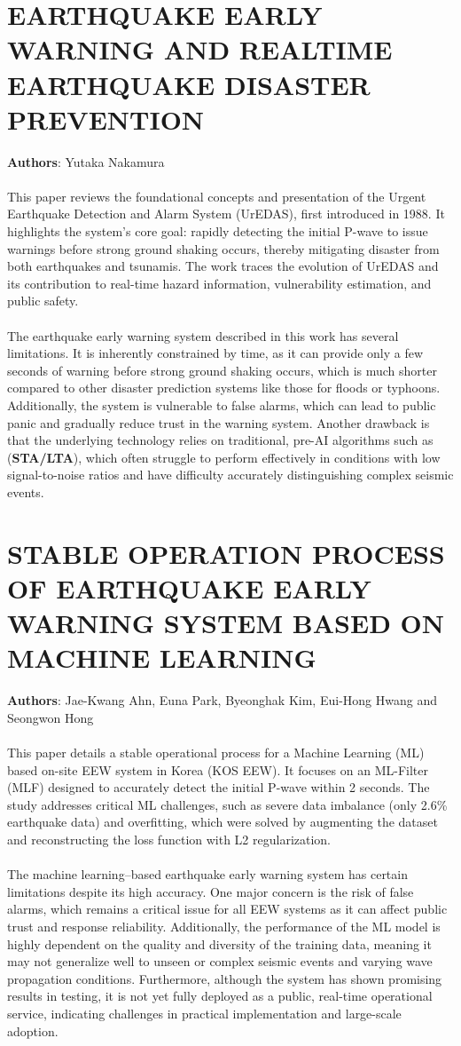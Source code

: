 \documentclass[a4paper,12pt]{report}
\begin{document}
\section{EARTHQUAKE EARLY WARNING AND REALTIME EARTHQUAKE DISASTER PREVENTION}
\label{sec:2.2}
\textbf{Authors}: Yutaka Nakamura\\
\\
This paper reviews the foundational concepts and presentation of the Urgent Earthquake Detection and Alarm System (UrEDAS), first introduced in 1988. It highlights the system's core goal: rapidly detecting the initial P-wave to issue warnings before strong ground shaking occurs, thereby mitigating disaster from both earthquakes and tsunamis. The work traces the evolution of UrEDAS and its contribution to real-time hazard information, vulnerability estimation, and public safety.
\\
\\
The earthquake early warning system described in this work has several limitations. It is inherently constrained by time, as it can provide only a few seconds of warning before strong ground shaking occurs, which is much shorter compared to other disaster prediction systems like those for floods or typhoons. Additionally, the system is vulnerable to false alarms, which can lead to public panic and gradually reduce trust in the warning system. Another drawback is that the underlying technology relies on traditional, pre-AI algorithms such as (\textbf{STA/LTA}), which often struggle to perform effectively in conditions with low signal-to-noise ratios and have difficulty accurately distinguishing complex seismic events.
\section{STABLE OPERATION PROCESS OF EARTHQUAKE EARLY WARNING SYSTEM BASED ON MACHINE LEARNING}
\label{sec:2.3}
\textbf{Authors}: Jae-Kwang Ahn, Euna Park, Byeonghak Kim, Eui-Hong Hwang and Seongwon Hong\\
\\
This paper details a stable operational process for a Machine Learning (ML) based on-site EEW system in Korea (KOS EEW). It focuses on an ML-Filter (MLF) designed to accurately detect the initial P-wave within 2 seconds. The study addresses critical ML challenges, such as severe data imbalance (only 2.6\% earthquake data) and overfitting, which were solved by augmenting the dataset and reconstructing the loss function with L2 regularization.
\\
\\
The machine learning–based earthquake early warning system has certain limitations despite its high accuracy. One major concern is the risk of false alarms, which remains a critical issue for all EEW systems as it can affect public trust and response reliability. Additionally, the performance of the ML model is highly dependent on the quality and diversity of the training data, meaning it may not generalize well to unseen or complex seismic events and varying wave propagation conditions. Furthermore, although the system has shown promising results in testing, it is not yet fully deployed as a public, real-time operational service, indicating challenges in practical implementation and large-scale adoption.
\end{document}
